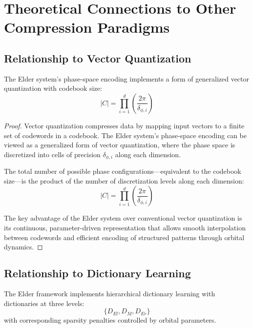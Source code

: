 \section{Theoretical Connections to Other Compression Paradigms}

\subsection{Relationship to Vector Quantization}

\begin{theorem}
The Elder system's phase-space encoding implements a form of generalized vector quantization with codebook size:
\begin{equation}
|C| = \prod_{i=1}^d \left(\frac{2\pi}{\delta_{\phi,i}}\right)
\end{equation}
\end{theorem}

\begin{proof}
Vector quantization compresses data by mapping input vectors to a finite set of codewords in a codebook. The Elder system's phase-space encoding can be viewed as a generalized form of vector quantization, where the phase space is discretized into cells of precision $\delta_{\phi,i}$ along each dimension.

The total number of possible phase configurations—equivalent to the codebook size—is the product of the number of discretization levels along each dimension:
\begin{equation}
|C| = \prod_{i=1}^d \left(\frac{2\pi}{\delta_{\phi,i}}\right)
\end{equation}

The key advantage of the Elder system over conventional vector quantization is its continuous, parameter-driven representation that allows smooth interpolation between codewords and efficient encoding of structured patterns through orbital dynamics.
\end{proof}

\subsection{Relationship to Dictionary Learning}

\begin{theorem}
The Elder framework implements hierarchical dictionary learning with dictionaries at three levels:
\begin{equation}
\{D_{El}, D_M, D_{Er}\}
\end{equation}
with corresponding sparsity penalties controlled by orbital parameters.
\end{theorem}

